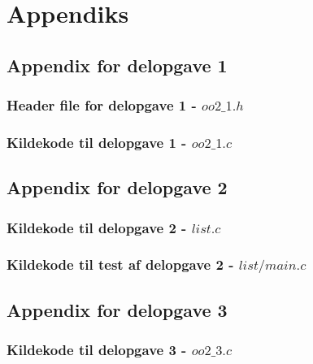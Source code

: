 \documentclass[main.tex]{subfile}
\begin{document}
\appendix
\section{Appendiks}
\subsection{Appendix for delopgave 1}
\subsubsection{Header file for delopgave 1 - $oo2\_1.h$}
\label{sec:oo2_1.h}

\subsubsection{Kildekode til delopgave 1 - $oo2\_1.c$}
\label{sec:oo2_1.c}
\pagebreak

\subsection{Appendix for delopgave 2}
\subsubsection{Kildekode til delopgave 2 - $list.c$}
\label{sec:list.c}
\pagebreak

\subsubsection{Kildekode til test af delopgave 2 - $list/main.c$}
\label{sec:main}
\pagebreak

\subsection{Appendix for delopgave 3}
\subsubsection{Kildekode til delopgave 3 - $oo2\_3.c$}
\label{sec:procon}
\pagebreak
\end{document}
